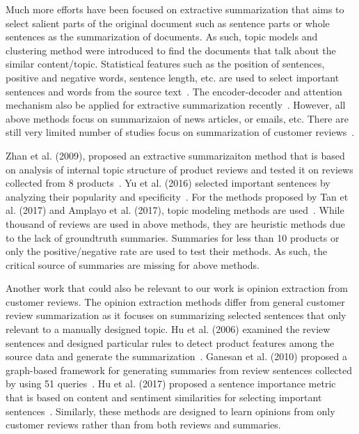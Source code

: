 \documentclass[letterpaper]{article}
\begin{document}
Much more efforts have been focused on extractive summarization that aims to select salient parts of the original document such as sentence parts or whole sentences as the summarization of documents. As such, topic models and clustering method were introduced to find the documents that talk about the similar content/topic. Statistical features such as the position of sentences, positive and negative words, sentence length, etc. are used to select important sentences and words from the source text~\cite{Fattah2009GA, Abuobieda2012Text}. The encoder-decoder and attention mechanism also be applied for extractive summarization recently~\cite{Nallapati2017Summarunner}. However, all above methods focus on summarizaion of news articles, or emails, etc. There are still very limited number of studies focus on summarization of customer reviews~\cite{Zhan2009Gather, Yu2016Product, Amplayo2017Adaptable, Tan2017Sentence}. 

Zhan et al. (2009),  proposed an extractive summarizaiton method that is based on analysis of internal topic structure of product reviews and tested it on reviews collected from 8 products~\cite{Zhan2009Gather}. Yu et al. (2016) selected important sentences by analyzing their popularity and specificity~\cite{Yu2016Product}. For the methods proposed by Tan et al. (2017) and Amplayo et al. (2017), topic modeling methods are used~\cite{Amplayo2017Adaptable, Tan2017Sentence}. 
While thousand of reviews are used in above methods, they are heuristic methods due to the lack of groundtruth summaries. Summaries for less than 10 products or only the positive/negative rate are used to test their methods. As such, the critical source of summaries are missing for above methods.

Another work that could also be relevant to our work is opinion extraction from customer reviews. The opinion extraction methods differ from general customer review summarization as it focuses on summarizing selected sentences that only relevant to a manually designed topic. 
Hu et al. (2006) examined the review sentences and designed particular rules to detect product features among the source data and generate the summarization~\cite{Hu2006Opinion}. Ganesan et al. (2010) proposed a graph-based framework for generating summaries from review sentences  collected by using 51 queries~\cite{Ganesan2010Opiniosis}. Hu et al. (2017) proposed a sentence importance metric that is based on content and sentiment similarities for selecting important sentences~\cite{Hu2017Opinion}. Similarly, these methods are designed to learn opinions from only customer reviews rather than from both reviews and summaries.
\end{document}

